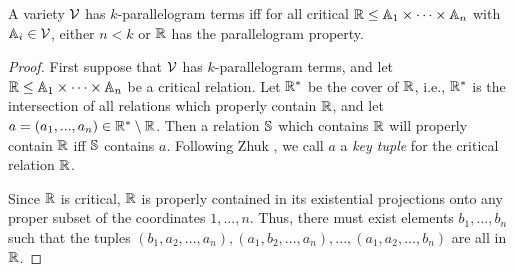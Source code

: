 \documentclass[letterpaper,11pt]{article}
\begin{document}
\begin{thm}\label{parallelogram-critical} A variety $\mathcal{V}$ has $k$-parallelogram terms iff for all critical $\mathbb{R} \le \mathbb{A}_1 \times \cdots \times \mathbb{A}_n$ with $\mathbb{A}_i \in \mathcal{V}$, either $n < k$ or $\mathbb{R}$ has the parallelogram property.
\end{thm}
\begin{proof} First suppose that $\mathcal{V}$ has $k$-parallelogram terms, and let $\mathbb{R} \le \mathbb{A}_1 \times \cdots \times \mathbb{A}_n$ be a critical relation. Let $\mathbb{R}^*$ be the cover of $\mathbb{R}$, i.e., $\mathbb{R}^*$ is the intersection of all relations which properly contain $\mathbb{R}$, and let $a = (a_1, ..., a_n) \in \mathbb{R}^*\setminus \mathbb{R}$. Then a relation $\mathbb{S}$ which contains $\mathbb{R}$ will properly contain $\mathbb{R}$ iff $\mathbb{S}$ contains $a$. Following Zhuk \cite{zhuk-key}, we call $a$ a \emph{key tuple} for the critical relation $\mathbb{R}$.

Since $\mathbb{R}$ is critical, $\mathbb{R}$ is properly contained in its existential projections onto any proper subset of the coordinates $1, ..., n$. Thus, there must exist elements $b_1, ..., b_n$ such that the tuples $(b_1,a_2,...,a_n), (a_1,b_2,...,a_n), ..., (a_1, a_2, ..., b_n)$ are all in $\mathbb{R}$.


\end{proof}
\end{document}
